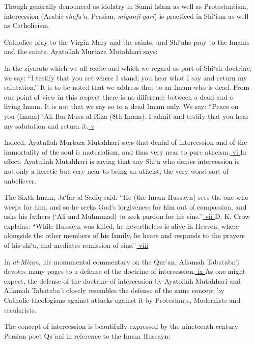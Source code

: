 Though generally denounced as idolatry in Sunni Islam as well as Protestantism, intercession (Arabic s\emph{hafa'a}, Persian;
\emph{miyanji gari}) is practiced in Shi`ism as well as Catholicism.

Catholics pray to the Virgin Mary and the saints, and Shi`ahs pray to the Imams and the saints. Ayatollah Murtaza Mutahhari says:

\begin{quotex}
In the ziyarats which we all recite and which we regard as part of Shi`ah doctrine, we say: ``I testify that you see where I stand; you hear what I say and return my salutation.'' It is to be noted that we address that to an Imam who is dead. From our point of view in this respect there is no difference between a dead and a living Imam. It is not that we say so to a dead Imam only. We say: ``Peace on you (Imam) `Ali Ibn Musa al-Riza (8th Imam). I admit and testify that you hear my salutation and return it.\hyperref[_edn5]{ v }
\end{quotex}


Indeed, Ayatullah Murtaza Mutahhari says that denial of intercession and of the immortality of the soul is materialism, and thus very near to pure atheism.\hyperref[_edn6]{ vi } In effect, Ayatullah Mutahhari is saying that any Shi`a who denies intercession is not only a heretic but very near to being an atheist, the very worst sort of unbeliever.

The Sixth Imam, Ja`far al-Sadiq said: ``He (the Imam Hussayn) sees the one who weeps for him, and so he seeks God's forgiveness for him out of compassion, and asks his fathers (`Ali and Muhmmad) to seek pardon for his sins.''\hyperref[_edn7]{ vii } D. K. Crow explains: ``While Hussayn was killed, he nevertheless is alive in Heaven, where alongside the other members of his family, he hears and responds to the prayers of his shi`a, and mediates remission of sins.''\hyperref[_edn8]{ viii }

In \emph{al-Mizan}, his monumental commentary on the Qur'an, Allamah Tabataba'i devotes many pages to a defense of the doctrine of intercession.\hyperref[_edn9]{ ix } As one might expect, the defense of the doctrine of intercession by Ayatollah Mutahhari and Allamah Tabataba'i closely resembles the defense of the same concept by Catholic theologians against attacks against it by Protestants, Modernists and secularists.

The concept of intercession is beautifully expressed by the nineteenth century Persian poet Qa'ani in reference to the Imam Hussayn:

